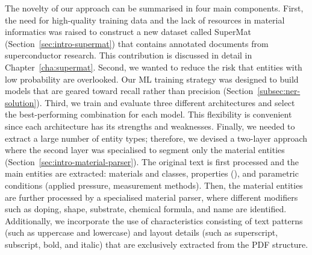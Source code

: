 The novelty of our approach can be summarised in four main components. 
First, the need for high-quality training data and the lack of resources in material informatics was raised to construct a new dataset called SuperMat (Section~\ref{sec:intro-supermat}) that contains annotated documents from superconductor research. This contribution is discussed in detail in Chapter~\ref{cha:supermat}.
Second, we wanted to reduce the risk that entities with low probability are overlooked. Our ML training strategy was designed to build models that are geared toward recall rather than precision (Section~\ref{subsec:ner-solution}).
Third, we train and evaluate three different architectures and select the best-performing combination for each model. This flexibility is convenient since each architecture has its strengths and weaknesses.  
Finally, we needed to extract a large number of entity types; therefore, we devised a two-layer approach where the second layer was specialised to segment only the material entities (Section~\ref{sec:intro-material-parser}).  
The original text is first processed and the main entities are extracted: materials and classes, properties (\tc), and parametric conditions (applied pressure, measurement methods). 
Then, the material entities are further processed by a specialised material parser, where different modifiers such as doping, shape, substrate, chemical formula, and name are identified. 
Additionally, we incorporate the use of characteristics consisting of text patterns (such as uppercase and lowercase) and layout details (such as superscript, subscript, bold, and italic) that are exclusively extracted from the PDF structure.

